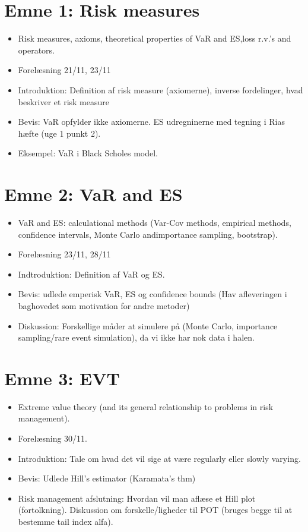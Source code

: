 \documentclass[a4paper,12pt,openany]{book}
\providecommand{\tightlist}{%
 \setlength{\itemsep}{0pt}\setlength{\parskip}{0pt}}
\begin{document}
\hypertarget{emne-1-risk-measures}{%
\section{Emne 1: Risk measures}\label{emne-1-risk-measures}}

\begin{itemize}
\tightlist
\item
  Risk measures, axioms, theoretical properties of VaR and ES,loss r.v.'s and operators.
\item
  Forelæsning 21/11, 23/11
\item
  Introduktion: Definition af risk measure (axiomerne), inverse fordelinger, hvad beskriver et risk measure
\item
  Bevis: VaR opfylder ikke axiomerne. ES udregninerne med tegning i Rias hæfte (uge 1 punkt 2).
\item
  Eksempel: VaR i Black Scholes model.
\end{itemize}

\hypertarget{emne-2-var-and-es}{%
\section{Emne 2: VaR and ES}\label{emne-2-var-and-es}}

\begin{itemize}
\tightlist
\item
  VaR and ES: calculational methods (Var-Cov methods, empirical methods, confidence intervals, Monte Carlo andimportance sampling, bootstrap).
\item
  Forelæsning 23/11, 28/11
\item
  Indtroduktion: Definition af VaR og ES.
\item
  Bevis: udlede emperisk VaR, ES og confidence bounds (Hav afleveringen i baghovedet som motivation for andre metoder)
\item
  Diskussion: Forskellige måder at simulere på (Monte Carlo, importance sampling/rare event simulation), da vi ikke har nok data i halen.
\end{itemize}

\hypertarget{emne-3-evt}{%
\section{Emne 3: EVT}\label{emne-3-evt}}

\begin{itemize}
\tightlist
\item
  Extreme value theory (and its general relationship to problems in risk management).
\item
  Forelæsning 30/11.
\item
  Introduktion: Tale om hvad det vil sige at være regularly eller slowly varying.
\item
  Bevis: Udlede Hill's estimator (Karamata's thm)
\item
  Risk management afslutning: Hvordan vil man aflæse et Hill plot (fortolkning). Diskussion om forskelle/ligheder til POT (bruges begge til at bestemme tail index alfa).
\end{itemize}
\end{document}
